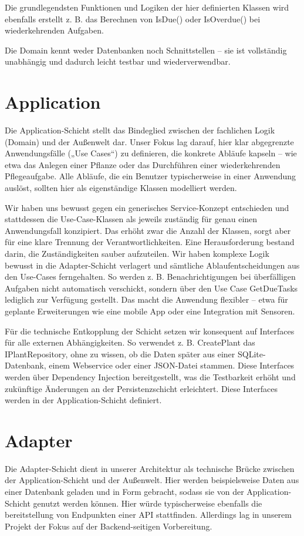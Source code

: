 Die grundlegendsten Funktionen und Logiken der hier definierten Klassen wird ebenfalls erstellt z. B. das Berechnen von IsDue() oder IsOverdue()
bei wiederkehrenden Aufgaben.

Die Domain kennt weder Datenbanken noch Schnittstellen – sie ist vollständig unabhängig und dadurch leicht testbar und wiederverwendbar.
\section{Application}
Die Application-Schicht stellt das Bindeglied zwischen der fachlichen Logik (Domain) und der Außenwelt dar. Unser Fokus lag darauf, hier klar
abgegrenzte Anwendungsfälle („Use Cases“) zu definieren, die konkrete Abläufe kapseln – wie etwa das Anlegen einer Pflanze oder das Durchführen
einer wiederkehrenden Pflegeaufgabe. Alle Abläufe, die ein Benutzer typischerweise in einer Anwendung auslöst, sollten hier als eigenständige
Klassen modelliert werden.

Wir haben uns bewusst gegen ein generisches Service-Konzept entschieden und stattdessen die Use-Case-Klassen als jeweils zuständig für genau
einen Anwendungsfall konzipiert. Das erhöht zwar die Anzahl der Klassen, sorgt aber für eine klare Trennung der Verantwortlichkeiten. Eine
Herausforderung bestand darin, die Zuständigkeiten sauber aufzuteilen. Wir haben komplexe Logik bewusst in die Adapter-Schicht verlagert und
sämtliche Ablaufentscheidungen aus den Use-Cases ferngehalten. So werden z. B. Benachrichtigungen bei überfälligen Aufgaben nicht automatisch
verschickt, sondern über den Use Case GetDueTasks lediglich zur Verfügung gestellt. Das macht die Anwendung flexibler – etwa für geplante
Erweiterungen wie eine mobile App oder eine Integration mit Sensoren.

Für die technische Entkopplung der Schicht setzen wir konsequent auf Interfaces für alle externen Abhängigkeiten. So verwendet z. B. CreatePlant
das IPlantRepository, ohne zu wissen, ob die Daten später aus einer SQLite-Datenbank, einem Webservice oder einer JSON-Datei stammen. Diese
Interfaces werden über Dependency Injection bereitgestellt, was die Testbarkeit erhöht und zukünftige Änderungen an der Persistenzschicht
erleichtert. Diese Interfaces werden in der Application-Schicht definiert.
\section{Adapter}
Die Adapter-Schicht dient in unserer Architektur als technische Brücke zwischen der Application-Schicht und der Außenwelt. Hier werden
beispielsweise Daten aus einer Datenbank geladen und in Form gebracht, sodass sie von der Application-Schicht genutzt
werden können. Hier würde typischerweise ebenfalls die bereitstellung von Endpunkten einer API stattfinden. Allerdings lag in unserem Projekt
der Fokus auf der Backend-seitigen Vorbereitung.

